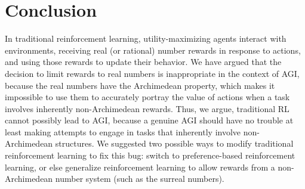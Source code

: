 \documentclass[reqno]{article}
\theoremstyle{definition}
\begin{document}
\section{Conclusion}
\label{conclusionsection}

In traditional reinforcement learning, utility-maximizing agents interact
with environments, receiving real (or rational) number rewards in response to
actions, and using those rewards to update their behavior. We have argued that
the decision to limit rewards to real numbers is inappropriate in the context
of AGI, because the real numbers have the Archimedean property, which makes it
impossible to use them to accurately portray the value of actions when a task
involves inherently non-Archimedean rewards. Thus, we argue, traditional
RL cannot possibly lead to AGI, because a genuine AGI should have no trouble
at least making attempts to engage in tasks that inherently involve
non-Archimedean structures. We suggested two possible ways
to modify traditional reinforcement learning to fix this bug: switch to
preference-based reinforcement learning, or else generalize reinforcement learning
to allow rewards from a non-Archimedean number system (such as the surreal numbers).




\end{document}

